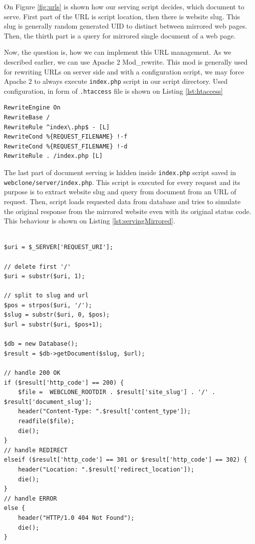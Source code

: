 On Figure \ref{fig:urls} is shown how our serving script decides, which document to serve. First part of the URL is script location, then there is website slug. This slug is generally random generated UID to distinct between mirrored web pages. Then, the thirth part is a query for mirrored single document of a web page.

Now, the question is, how we can implement this URL management. As we described earlier, we can use Apache 2 Mod\_rewrite. This mod is generally used for rewriting URLs on server side and with a configuration script, we may force Apache 2 to always execute \texttt{index.php} script in our script directory. Used configuration, in form of \texttt{.htaccess} file is shown on Listing \ref{lst:htaccess}

\begin{lstlisting}[caption={Example of .htaccess for Apache 2 mod\_rewrite},label={lst:htaccess}]
RewriteEngine On
RewriteBase /
RewriteRule ^index\.php$ - [L]
RewriteCond %{REQUEST_FILENAME} !-f
RewriteCond %{REQUEST_FILENAME} !-d
RewriteRule . /index.php [L]
\end{lstlisting}

The last part of document serving is hidden inside \texttt{index.php} script saved in \texttt{webclone/server/index.php}. This script is executed for every request and its purpose is to extract website slug and query from document from an URL of request. Then, script loads requested data from database and tries to simulate the original response from the mirrored website even with its original status code.  This behaviour is shown on Listing \ref{lst:servingMirrored}.

\begin{lstlisting}[caption={Serving of mirrored documents},label={lst:servingMirrored}]

$uri = $_SERVER['REQUEST_URI'];

// delete first '/'
$uri = substr($uri, 1);

// split to slug and url
$pos = strpos($uri, '/');
$slug = substr($uri, 0, $pos);
$url = substr($uri, $pos+1);

$db = new Database();
$result = $db->getDocument($slug, $url);

// handle 200 OK
if ($result['http_code'] == 200) {
    $file =  WEBCLONE_ROOTDIR . $result['site_slug'] . '/' . $result['document_slug'];
    header("Content-Type: ".$result['content_type']);
    readfile($file);
    die();
} 
// handle REDIRECT
elseif ($result['http_code'] == 301 or $result['http_code'] == 302) {
    header("Location: ".$result['redirect_location']);
    die();
}
// handle ERROR
else {
    header("HTTP/1.0 404 Not Found");
    die();
}
\end{lstlisting}
